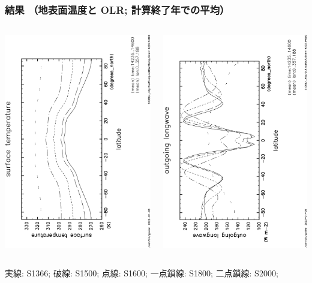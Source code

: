 \documentclass[aspectratio=149,9pt,fleqn]{beamer}
\begin{document}
\begin{frame}
	\frametitle{結果 （地表面温度と OLR; 計算終了年での平均）}
	\begin{columns}[T]
		\begin{column}{.45\textwidth}
			\centering
			\includegraphics[height=\textwidth,angle=-90]{SurfTemp-overplot-crop.pdf}
		\end{column}
		\begin{column}{.45\textwidth}
			\centering
			\includegraphics[height=\textwidth,angle=-90]{OLR-overplot-crop.pdf}
		\end{column}
	\end{columns}
	実線: S1366; 破線: S1500; 点線: S1600; 一点鎖線: S1800; 二点鎖線: S2000;
\end{frame}
\end{document}
